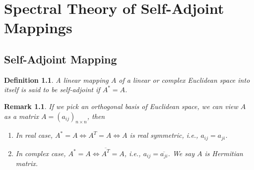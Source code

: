 \documentclass[11pt]{book}
\newtheorem{definition}{Definition}[section]
\newtheorem{remark}{Remark}[section]
\theoremstyle{definition}
\numberwithin{equation}{subsection}
\begin{document}
\chapter{Spectral Theory of Self-Adjoint Mappings}
\section{Self-Adjoint Mapping}
\begin{definition}
A linear mapping $A$ of a linear or complex Euclidean space into itself is said to be self-adjoint if $A^* = A$. 
\end{definition}
\begin{remark}
If we pick an orthogonal basis of Euclidean space, we can view $A$ as a matrix $A = (a_{ij})_{n\times n}$, then 
\begin{enumerate}[label=(\roman*)]
    \item In real case, $A^* = A \iff A^T = A \iff A$ is real symmetric, i.e., $a_{ij} = a_{ji}$. 
    \item In complex case, $A^* = A \iff \overline{A^T} = A$, i.e., $a_{ij} = \overline{a_{ji}}$. We say $A$ is Hermitian matrix.
\end{enumerate}
\end{remark}

\medskip
\end{document}
